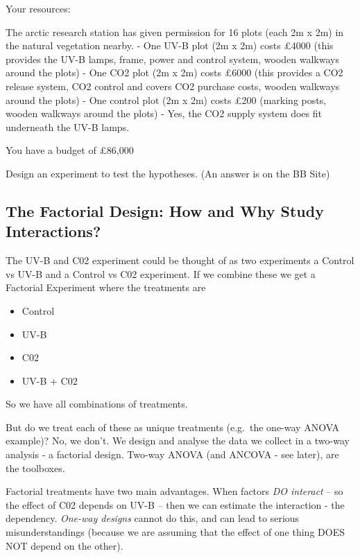 \documentclass[
]{book}
\providecommand{\tightlist}{%
  \setlength{\itemsep}{0pt}\setlength{\parskip}{0pt}}
\begin{document}
Your resources:

The arctic research station has given permission for 16 plots (each 2m x 2m) in the natural vegetation nearby.
- One UV-B plot (2m x 2m) costs £4000 (this provides the UV-B lamps, frame, power and control system, wooden walkways around the plots)
- One CO2 plot (2m x 2m) costs £6000 (this provides a CO2 release system, CO2 control and covers CO2 purchase costs, wooden walkways around the plots)
- One control plot (2m x 2m) costs £200 (marking posts, wooden walkways around the plots)
- Yes, the CO2 supply system does fit underneath the UV-B lamps.

You have a budget of £86,000

Design an experiment to test the hypotheses. (An answer is on the BB Site)

\hypertarget{the-factorial-design-how-and-why-study-interactions}{%
\subsection{The Factorial Design: How and Why Study Interactions?}\label{the-factorial-design-how-and-why-study-interactions}}

The UV-B and C02 experiment could be thought of as two experiments a Control vs UV-B and a Control vs C02 experiment. If we combine these we get a Factorial Experiment where the treatments are

\begin{itemize}
\tightlist
\item
  Control
\item
  UV-B
\item
  C02
\item
  UV-B + C02
\end{itemize}

So we have all combinations of treatments.

But do we treat each of these as unique treatments (e.g.~the one-way ANOVA example)? No, we don't. We design and analyse the data we collect in a two-way analysis - a factorial design. Two-way ANOVA (and ANCOVA - see later), are the toolboxes.

Factorial treatments have two main advantages. When factors \emph{DO interact} -- so the effect of C02 depends on UV-B -- then we can estimate the interaction - the dependency. \emph{One-way designs} cannot do this, and can lead to serious misunderstandings (because we are assuming that the effect of one thing DOES NOT depend on the other).
\end{document}
